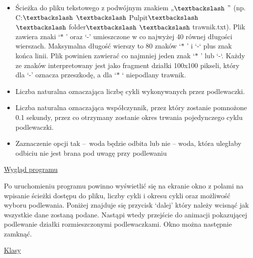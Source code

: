 \documentclass[12pt]{article}
\renewcommand{\_}{\kern-1.5pt\textunderscore\kern-1.5pt}
\begin{document}
\begin{itemize}
	\item Ścieżka do pliku tekstowego z podwójnym znakiem „$\textbackslash$ $"$  (np. C:$\textbackslash$ $\textbackslash$ Pulpit$\textbackslash$ $\textbackslash$ folder$\textbackslash$ $\textbackslash$ trawnik.txt). Plik zawiera znaki ‘$\ast$  ’ oraz ‘-’ umieszczone w co najwyżej 40 równej długości wierszach. Maksymalna długość wierszy to 80 znaków ‘$\ast$ ’ i ‘-‘ plus znak końca linii. Plik powinien zawierać co najmniej jeden znak ‘$\ast$ ’ lub ‘-‘. Każdy ze znaków interpretowany jest jako fragment działki 100x100 pikseli, który dla ‘-’ oznacza przeszkodę, a dla ‘$\ast$ ‘ niepodlany trawnik.\par

	\item Liczba naturalna oznaczająca liczbę cykli wykonywanych przez podlewaczki. \par

	\item  Liczba naturalna oznaczająca współczynnik, przez który zostanie pomnożone 0.1 sekundy, przez co otrzymany zostanie okres trwania pojedynczego cyklu podlewaczki. \par

	\item Zaznaczenie opcji tak –\ woda będzie odbita lub nie –  woda, która uległaby odbiciu nie jest brana pod uwagę przy podlewaniu 
\end{itemize}\par


\vspace{\baselineskip}
{\fontsize{16pt}{19.2pt}\selectfont \uline{Wygląd programu}\par}\par

Po uruchomieniu programu powinno wyświetlić się na ekranie okno z polami na wpisanie ścieżki dostępu do pliku, liczby cykli i okresu cykli oraz możliwość wyboru podlewania. Poniżej znajduje się przycisk ‘dalej’ który należy wcisnąć jak wszystkie dane zostaną podane. Nastąpi wtedy przejście do animacji pokazującej podlewanie działki rozmieszczonymi podlewaczkami. Okno można następnie zamknąć.\par


\vspace{\baselineskip}
{\fontsize{16pt}{19.2pt}\selectfont \uline{Klasy}\par}\par
\end{document}
